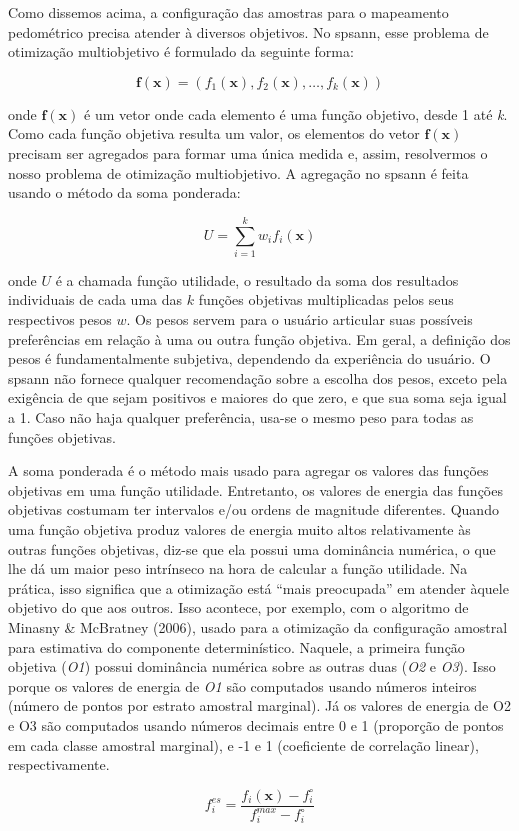 Como dissemos acima, a configuração das amostras para o mapeamento pedométrico
precisa atender à diversos objetivos. No spsann, esse problema de otimização
multiobjetivo é formulado da seguinte forma:

\begin{equation}
\label{eqn:multiobjetivo}
\mathbf{f}(\mathbf{x}) = (f_1(\mathbf{x}), f_2(\mathbf{x}), 
                          \ldots, f_k(\mathbf{x}))
\end{equation}

onde $\mathbf{f}(\mathbf{x})$ é um vetor onde cada elemento é uma função
objetivo, desde 1 até \textit{k}. Como cada função objetiva resulta um valor, 
os elementos do vetor $\mathbf{f}(\mathbf{x})$ precisam ser agregados para 
formar uma única medida e, assim, resolvermos o nosso problema de otimização
 multiobjetivo. A agregação no spsann é feita usando o método da soma ponderada:

\begin{equation}
\label{eqn:soma}
U = \sum_{i=1}^{k} w_if_i(\mathbf{x})
\end{equation}

onde $U$ é a chamada função utilidade, o resultado da soma dos resultados 
individuais de cada uma das $k$ funções objetivas multiplicadas pelos seus 
respectivos pesos $w$. Os pesos servem para o usuário articular suas possíveis
 preferências em relação à uma ou outra função objetiva. Em geral, a definição 
dos pesos é fundamentalmente subjetiva, dependendo da experiência do usuário. O
 spsann não fornece qualquer recomendação sobre a escolha dos pesos, exceto 
pela exigência de que sejam positivos e maiores do que zero, e que sua soma 
seja igual a 1. Caso não haja qualquer preferência, usa-se o mesmo peso para 
todas as funções objetivas.

A soma ponderada é o método mais usado para agregar os valores das funções 
objetivas em uma função utilidade. Entretanto, os valores de energia das funções
 objetivas costumam ter intervalos e/ou ordens de magnitude diferentes. Quando 
uma função objetiva produz valores de energia muito altos relativamente às 
outras funções objetivas, diz-se que ela possui uma dominância numérica, o que
 lhe dá um maior peso intrínseco na hora de calcular a função utilidade. Na 
prática, isso significa que a otimização está “mais preocupada” em atender 
àquele objetivo do que aos outros. Isso acontece, por exemplo, com o algoritmo
 de Minasny & McBratney (2006), usado para a otimização da configuração amostral
 para estimativa do componente determinístico. Naquele, a primeira função 
objetiva (\textit{O1}) possui dominância numérica sobre as outras duas 
(\textit{O2} e \textit{O3}). Isso porque os valores de energia de \textit{O1} 
são computados usando números inteiros (número de pontos por estrato amostral 
marginal). Já os valores de energia de O2 e O3 são computados usando números 
decimais entre 0 e 1 (proporção de pontos em cada classe amostral marginal), e 
-1 e 1 (coeficiente de correlação linear), respectivamente.

\begin{equation}
\label{eqn:escalonamento}
f^{es}_i = \frac{f_i(\mathbf{x}) - f^\circ_i}{f^{max}_i - f^\circ_i}
\end{equation}
